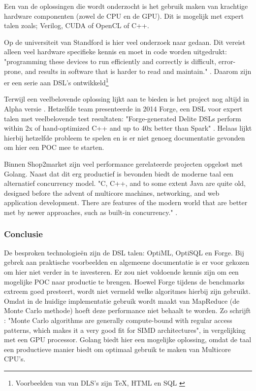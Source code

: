 Een van de oplossingen die wordt onderzocht is het gebruik maken van krachtige hardware componenten (zowel de CPU en de GPU). Dit is mogelijk met expert talen zoals; Verilog, CUDA of OpenCL of C++.


Op de universiteit van Standford is hier veel onderzoek naar gedaan. Dit vereist alleen veel hardware specifieke kennis en moet in code worden uitgedrukt: "programming these devices to run efficiently and correctly is difficult, error-prone, and results in software that is harder to read and maintain." \parencite{sujeeth2011optiml}. Daarom zijn er een serie aan DSL's ontwikkeld\footnote{Voorbeelden van van DLS's zijn \TeX, HTML en SQL  \parencite{sigplan2000dsl}}

Terwijl \textcite{sujeeth2011optiml} een veelbelovende oplossing lijkt aan te bieden is het project nog altijd in Alpha versie \parencite{optiml_project_home}. Hetzelfde team presenteerde in 2014 Forge, een DSL voor expert talen met veelbelovende test resultaten: "Forge-generated Delite DSLs perform within 2x of hand-optimized C++ and up to 40x better than Spark" \parencite{sujeeth2014forge}. Helaas lijkt hierbij hetzelfde probleem te spelen en is er niet genoeg documentatie gevonden om hier een POC mee te starten.

Binnen Shop2market zijn veel performance gerelateerde projecten opgelost met Golang. Naast dat dit erg productief is bevonden biedt de moderne taal een alternatief concurrency model. "C, C++, and to some extent Java are quite old, designed before the advent of multicore machines, networking, and web application development. There are features of the modern world that are better met by newer approaches, such as built-in concurrency." \parencite{pike2012go}.

\subsubsection{\textbf{Conclusie}}

De besproken technologieën zijn de DSL talen: OptiML, OptiSQL en Forge. Bij gebrek aan praktische voorbeelden en algemeene documentatie is er voor gekozen om hier niet verder in te investeren. Er zou niet voldoende kennis zijn om een mogelijke POC naar productie te brengen. Hoewel Forge tijdens de benchmarks extreem goed presteert, wordt niet vermeld welke algoritmes hierbij zijn gebruikt. Omdat in de huidige implementatie gebruik wordt maakt van MapReduce (de Monte Carlo methode) hoeft deze performance niet behaalt te worden. Zo schrijft \textcite{lee2010debunking}: "Monte Carlo algorithms are generally compute-bound with regular access patterns, which makes it a very good fit for SIMD architectures", in vergelijking met een GPU processor. Golang biedt hier een mogelijke oplossing, omdat de taal een productieve manier biedt om optimaal gebruik te maken van Multicore CPU's.

